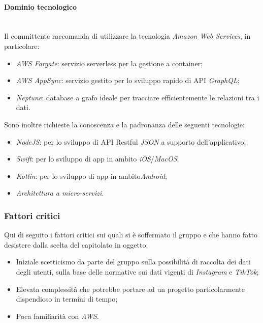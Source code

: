 \documentclass[11pt]{article}
\begin{document}
        \paragraph{Dominio tecnologico}~\\
        
        \noindent
        Il committente raccomanda di utilizzare la tecnologia \textit{Amazon Web Services}, in particolare:
		\begin{itemize}
			\item \textit{AWS Fargate}: servizio serverless per la gestione a container;
			\item \textit{AWS AppSync}: servizio gestito per lo sviluppo rapido di API \textit{GraphQL};
			\item \textit{Neptune}: database a grafo ideale per tracciare efficientemente le relazioni tra i dati.
		\end{itemize}
		Sono inoltre richieste la conoscenza e la padronanza delle seguenti tecnologie:
		\begin{itemize}
			\item \textit{NodeJS}: per lo sviluppo di API Restful \textit{JSON} a supporto dell'applicativo;
			\item \textit{Swift}: per lo sviluppo di app in ambito \textit{iOS}/\textit{MacOS};
			\item \textit{Kotlin}: per lo sviluppo di app in ambito\textit{Android};
			\item \textit{Architettura a micro-servizi}.
		\end{itemize}
    
    \subsubsection{Fattori critici}
    Qui di seguito i fattori critici sui quali si è soffermato il gruppo e che hanno fatto desistere dalla scelta del capitolato in
    oggetto:
    \begin{itemize}
    	\item Iniziale scetticismo da parte del gruppo sulla possibilità di raccolta dei dati degli utenti, sulla base
    	delle normative sui dati vigenti di \textit{Instagram} e \textit{TikTok};
		\item Elevata complessità che potrebbe portare ad un progetto particolarmente dispendioso in termini di tempo;
		\item Poca familiarità con \textit{AWS}.
    \end{itemize}
        
\end{document}
